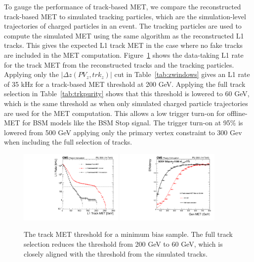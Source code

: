 To gauge the performance of track-based MET, we compare the reconstructed track-based MET to simulated tracking particles, which are the simulation-level trajectories of charged particles in an event. The tracking particles are used to compute the simulated MET using the same algorithm as the reconstructed L1 tracks. This gives the expected L1 track MET in the case where no fake tracks are included in the MET computation. Figure~\ref{fig:TkMETPerformance} shows the data-taking L1 rate for the track MET from the reconstructed tracks and the tracking particles. Applying only the $\vert \Delta z\left(PV_{z}, trk_{z}\right) \vert$ cut in Table~\ref{tab:zwindows} gives an L1 rate of 35 kHz for a track-based MET threshold at 200 GeV. Applying the full track selection in Table~\ref{tab:trkpurity} shows that this threshold is lowered to 60 GeV, which is the same threshold as when only simulated charged particle trajectories are used for the MET computation.
This allows a low trigger turn-on for offline-MET for BSM models like the BSM Stop signal. The trigger turn-on at 95$\%$ is lowered from 500 GeV applying only the primary vertex constraint to 300 Gev when including the full selection of tracks.
\begin{figure}
\includegraphics[width=0.45\textwidth ]{MinBiasTKMETRatePlot.pdf}
\includegraphics[width=0.45\textwidth ]{turnonMET.pdf}
\caption{The track MET threshold for a minimum bias sample. The full track selection reduces the threshold from 200 GeV to 60 GeV, which is closely aligned with the threshold from the simulated tracks.}
\label{fig:TkMETPerformance}
\end{figure}


